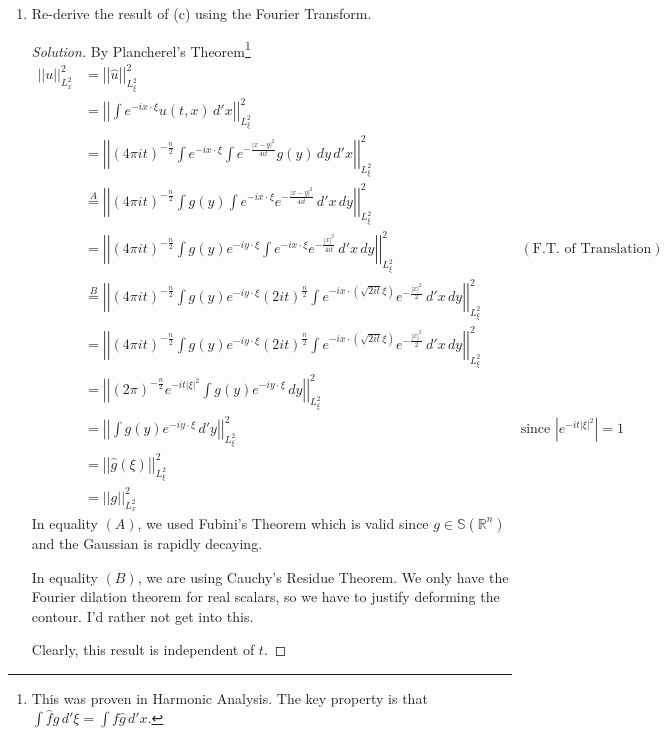 \documentclass[12pt]{article}
\newenvironment{solution}{\begin{proof}[Solution]}{\end{proof}}
\begin{document}
\begin{enumerate}[label=(\alph*)]
\begin{solution}
			Therefore, $E$ is a constant function of $t$.
		\end{solution}
		\item Re-derive the result of (c) using the Fourier Transform.
		\begin{solution}
			By Plancherel's Theorem\footnote{This was proven in Harmonic Analysis. The key property is that $\int \hat{f}g\,d'\xi=\int f\hat{g}\,d'x$.}
			\begin{equation}
				\begin{aligned}
					\left|\left|u \right|\right|_{L^2_x}^2 &= \left|\left|\hat{u} \right|\right|_{L^2_\xi}^2\\ &= \left|\left|\int e^{-ix\cdot\xi}u(t,x)\,d'x \right|\right|_{L^2_\xi}^2\\ &= \left|\left|(4\pi i t)^{-\frac{n}{2}}\int e^{-ix\cdot\xi}\int e^{-\frac{|x-y|^2}{4it}}g(y)\,dy\,d'x \right|\right|_{L^2_\xi}^2 \\
					&\stackrel{A}{=} \left|\left|(4\pi i t)^{-\frac{n}{2}}\int g(y)\int e^{-ix\cdot\xi}e^{-\frac{|x-y|^2}{4it}}\,d'x\,dy \right|\right|_{L^2_\xi}^2 \\
					&= \left|\left|(4\pi i t)^{-\frac{n}{2}}\int g(y) e ^{-iy\cdot\xi}\int e^{-ix\cdot\xi}e^{-\frac{|x|^2}{4it}}\,d'x\,dy \right|\right|_{L^2_\xi}^2&\qquad (\text{F.T. of Translation}) \\
					&\stackrel{B}{=} \left|\left|(4\pi i t)^{-\frac{n}{2}}\int g(y) e ^{-iy\cdot\xi} (2it)^{\frac{n}{2}}\int e^{-ix\cdot(\sqrt{2it}\xi)}e^{-\frac{|x|^2}{2}}\,d'x\,dy \right|\right|_{L^2_\xi}^2 \\
					&= \left|\left|(4\pi i t)^{-\frac{n}{2}}\int g(y) e ^{-iy\cdot\xi} (2it)^{\frac{n}{2}}\int e^{-ix\cdot(\sqrt{2it}\xi)}e^{-\frac{|x|^2}{2}}\,d'x\,dy \right|\right|_{L^2_\xi}^2 \\
					&= \left|\left|(2\pi)^{-\frac{n}{2}}e^{-it|\xi|^2}\int g(y) e ^{-iy\cdot\xi} \,dy \right|\right|_{L^2_\xi}^2 \\
					&= \left|\left|\int g(y)e^{-iy\cdot\xi}\,d'y \right|\right|_{L^2_\xi}^2 &\qquad \text{since } \left| e^{-it|\xi|^2} \right|=1  \\
					&= \left|\left|\hat{g}(\xi) \right|\right|_{L^2_\xi}^2 \\
					&= \left|\left|g \right|\right|_{L^2_x}^2
				\end{aligned}
			\end{equation}
			In equality $(A)$, we used Fubini's Theorem which is valid since $g\in \mathbb{S}(\mathbb{R}^n)$ and the Gaussian is rapidly decaying.
			
			In equality $(B)$, we are using Cauchy's Residue Theorem. We only have the Fourier dilation theorem for real scalars, so we have to justify deforming the contour. I'd rather not get into this.
			
			Clearly, this result is independent of $t$.
		\end{solution}
	\end{enumerate}
	
\end{document}

